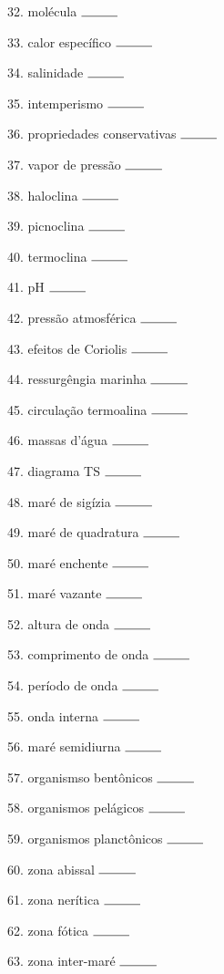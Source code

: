\documentclass[a4paper,10pt]{article}
\begin{document}
\begin{multicols}{2}
32. molécula $\rule{1cm}{0.15mm}$

33. calor específico $\rule{1cm}{0.15mm}$

34. salinidade $\rule{1cm}{0.15mm}$

35. intemperismo $\rule{1cm}{0.15mm}$

36. propriedades conservativas $\rule{1cm}{0.15mm}$

37. vapor de pressão $\rule{1cm}{0.15mm}$

38. haloclina $\rule{1cm}{0.15mm}$

39. picnoclina $\rule{1cm}{0.15mm}$

40. termoclina $\rule{1cm}{0.15mm}$

41. pH $\rule{1cm}{0.15mm}$

42. pressão atmosférica $\rule{1cm}{0.15mm}$

43. efeitos de Coriolis $\rule{1cm}{0.15mm}$

44. ressurgêngia marinha $\rule{1cm}{0.15mm}$

45. circulação termoalina $\rule{1cm}{0.15mm}$

46. massas d'água $\rule{1cm}{0.15mm}$

47. diagrama TS $\rule{1cm}{0.15mm}$

48. maré de sigízia $\rule{1cm}{0.15mm}$

49. maré de quadratura $\rule{1cm}{0.15mm}$

50. maré enchente $\rule{1cm}{0.15mm}$

51. maré vazante $\rule{1cm}{0.15mm}$

52. altura de onda $\rule{1cm}{0.15mm}$

53. comprimento de onda $\rule{1cm}{0.15mm}$

54. período de onda $\rule{1cm}{0.15mm}$

55. onda interna $\rule{1cm}{0.15mm}$

56. maré semidiurna $\rule{1cm}{0.15mm}$

57. organismso bentônicos $\rule{1cm}{0.15mm}$

58. organismos pelágicos $\rule{1cm}{0.15mm}$

59. organismos planctônicos $\rule{1cm}{0.15mm}$

60. zona abissal $\rule{1cm}{0.15mm}$

61. zona nerítica $\rule{1cm}{0.15mm}$

62. zona fótica $\rule{1cm}{0.15mm}$

63. zona inter-maré $\rule{1cm}{0.15mm}$


\end{multicols}
\end{document}
